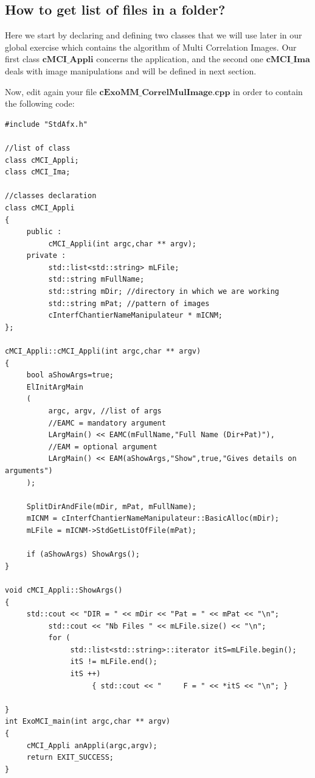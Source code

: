 \subsection{How to get list of files in a folder?}
Here we start by declaring and defining two classes that we will use later in our global exercise which contains the algorithm of Multi Correlation Images. Our first class $\textbf{cMCI\_Appli}$ concerns the application, and the second one $\textbf{cMCI\_Ima}$ deals with image manipulations and will be defined in next section. \newline

Now, edit again your file $\textbf{cExoMM\_CorrelMulImage.cpp}$ in order to contain the following code:

\begin{verbatim}
#include "StdAfx.h"

//list of class
class cMCI_Appli;
class cMCI_Ima;

//classes declaration
class cMCI_Appli
{
     public :
          cMCI_Appli(int argc,char ** argv);
     private :
          std::list<std::string> mLFile;
          std::string mFullName;
          std::string mDir; //directory in which we are working
          std::string mPat; //pattern of images
          cInterfChantierNameManipulateur * mICNM;
};

cMCI_Appli::cMCI_Appli(int argc,char ** argv)
{
     bool aShowArgs=true;
     ElInitArgMain
     (
          argc, argv, //list of args
          //EAMC = mandatory argument
          LArgMain() << EAMC(mFullName,"Full Name (Dir+Pat)"),
          //EAM = optional argument
          LArgMain() << EAM(aShowArgs,"Show",true,"Gives details on arguments")
     );

     SplitDirAndFile(mDir, mPat, mFullName);
     mICNM = cInterfChantierNameManipulateur::BasicAlloc(mDir);
     mLFile = mICNM->StdGetListOfFile(mPat);

     if (aShowArgs) ShowArgs();
}

void cMCI_Appli::ShowArgs()
{
     std::cout << "DIR = " << mDir << "Pat = " << mPat << "\n";
          std::cout << "Nb Files " << mLFile.size() << "\n";
          for (
               std::list<std::string>::iterator itS=mLFile.begin();
               itS != mLFile.end();
               itS ++)
                    { std::cout << "     F = " << *itS << "\n"; }

}
int ExoMCI_main(int argc,char ** argv)
{
     cMCI_Appli anAppli(argc,argv);
     return EXIT_SUCCESS;
}
\end{verbatim}


